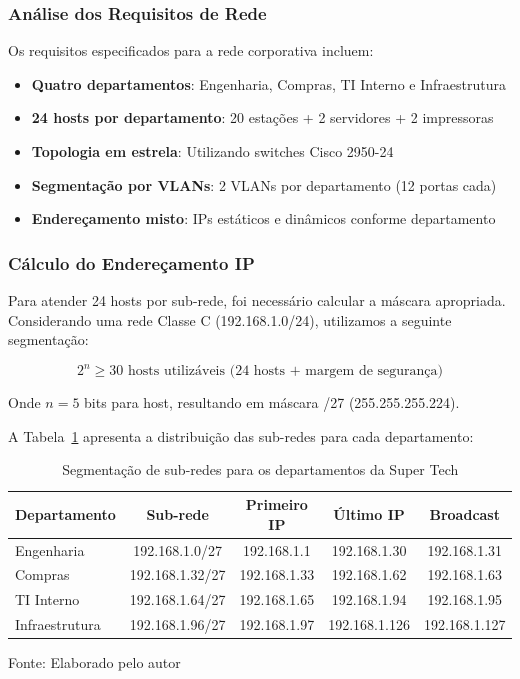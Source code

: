 \subsubsection{Análise dos Requisitos de Rede}

Os requisitos especificados para a rede corporativa incluem:

\begin{itemize}
    \item \textbf{Quatro departamentos}: Engenharia, Compras, TI Interno e Infraestrutura
    \item \textbf{24 hosts por departamento}: 20 estações + 2 servidores + 2 impressoras
    \item \textbf{Topologia em estrela}: Utilizando switches Cisco 2950-24
    \item \textbf{Segmentação por VLANs}: 2 VLANs por departamento (12 portas cada)
    \item \textbf{Endereçamento misto}: IPs estáticos e dinâmicos conforme departamento
\end{itemize}

\subsubsection{Cálculo do Endereçamento IP}

Para atender 24 hosts por sub-rede, foi necessário calcular a máscara apropriada. Considerando uma rede Classe C (192.168.1.0/24), utilizamos a seguinte segmentação:

\begin{equation}
2^n \geq 30 \text{ hosts utilizáveis (24 hosts + margem de segurança)}
\end{equation}

Onde $n = 5$ bits para host, resultando em máscara /27 (255.255.255.224).

A Tabela~\ref{tab:subredes_supertech} apresenta a distribuição das sub-redes para cada departamento:

\begin{table}[H]
\centering
    \caption{Segmentação de sub-redes para os departamentos da Super Tech}
    \begin{tabular}{|l|c|c|c|c|}
    \hline
    \textbf{Departamento} & \textbf{Sub-rede} & \textbf{Primeiro IP} & \textbf{Último IP} & \textbf{Broadcast} \\
    \hline
    Engenharia & 192.168.1.0/27 & 192.168.1.1 & 192.168.1.30 & 192.168.1.31 \\
    \hline
    Compras & 192.168.1.32/27 & 192.168.1.33 & 192.168.1.62 & 192.168.1.63 \\
    \hline
    TI Interno & 192.168.1.64/27 & 192.168.1.65 & 192.168.1.94 & 192.168.1.95 \\
    \hline
    Infraestrutura & 192.168.1.96/27 & 192.168.1.97 & 192.168.1.126 & 192.168.1.127 \\
    \hline
    \end{tabular}

\label{tab:subredes_supertech}

{\fontsize{10pt}{\baselineskip}\selectfont
Fonte: Elaborado pelo autor}
\end{table}

